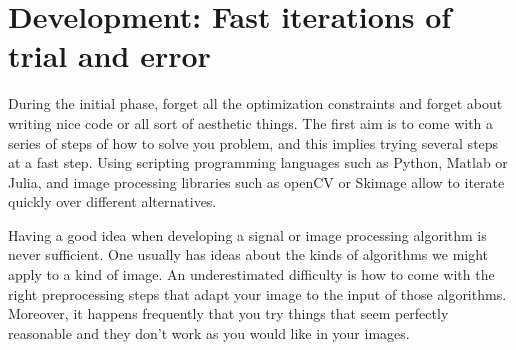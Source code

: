 \documentclass[24pt]{article}
\begin{document}
  
  
 \section{Development: Fast iterations of trial and error}
 
 During the initial phase, forget all the optimization constraints and forget about writing nice code or all sort of aesthetic things.  The first aim is to come with a series of steps of how to solve you problem, and this implies trying several steps at a fast step. Using scripting programming languages such as Python, Matlab or Julia, and image processing libraries such as openCV or Skimage allow to iterate quickly over different alternatives.
 
 
 Having a good idea when developing a signal or image processing algorithm is never sufficient. One usually has ideas about the kinds of 
 algorithms we might apply to a kind of image. An underestimated difficulty is how to come with the right preprocessing steps that adapt your image to the input of those algorithms. Moreover, it happens frequently that you try things that seem perfectly reasonable and they don't work as you would like in your images.  
 
\end{document}
